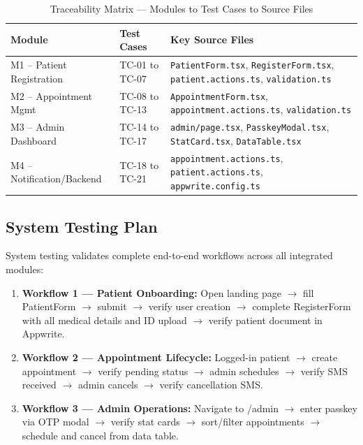 \documentclass[11pt,a4paper]{article}
\begin{document}
\begin{table}[H]
\centering
\caption{Traceability Matrix --- Modules to Test Cases to Source Files}
\begin{tabular}{|l|l|p{6.5cm}|}
\hline
\textbf{Module} & \textbf{Test Cases} & \textbf{Key Source Files} \\
\hline
M1 -- Patient Registration & TC-01 to TC-07 & \texttt{PatientForm.tsx}, \texttt{RegisterForm.tsx}, \texttt{patient.actions.ts}, \texttt{validation.ts} \\
\hline
M2 -- Appointment Mgmt & TC-08 to TC-13 & \texttt{AppointmentForm.tsx}, \texttt{appointment.actions.ts}, \texttt{validation.ts} \\
\hline
M3 -- Admin Dashboard & TC-14 to TC-17 & \texttt{admin/page.tsx}, \texttt{PasskeyModal.tsx}, \texttt{StatCard.tsx}, \texttt{DataTable.tsx} \\
\hline
M4 -- Notification/Backend & TC-18 to TC-21 & \texttt{appointment.actions.ts}, \texttt{patient.actions.ts}, \texttt{appwrite.config.ts} \\
\hline
\end{tabular}
\end{table}

\subsection{System Testing Plan}

System testing validates complete end-to-end workflows across all integrated modules:

\begin{enumerate}
    \item \textbf{Workflow 1 --- Patient Onboarding:} Open landing page $\rightarrow$ fill PatientForm $\rightarrow$ submit $\rightarrow$ verify user creation $\rightarrow$ complete RegisterForm with all medical details and ID upload $\rightarrow$ verify patient document in Appwrite.
    \item \textbf{Workflow 2 --- Appointment Lifecycle:} Logged-in patient $\rightarrow$ create appointment $\rightarrow$ verify pending status $\rightarrow$ admin schedules $\rightarrow$ verify SMS received $\rightarrow$ admin cancels $\rightarrow$ verify cancellation SMS.
    \item \textbf{Workflow 3 --- Admin Operations:} Navigate to /admin $\rightarrow$ enter passkey via OTP modal $\rightarrow$ verify stat cards $\rightarrow$ sort/filter appointments $\rightarrow$ schedule and cancel from data table.
\end{enumerate}
\end{document}
